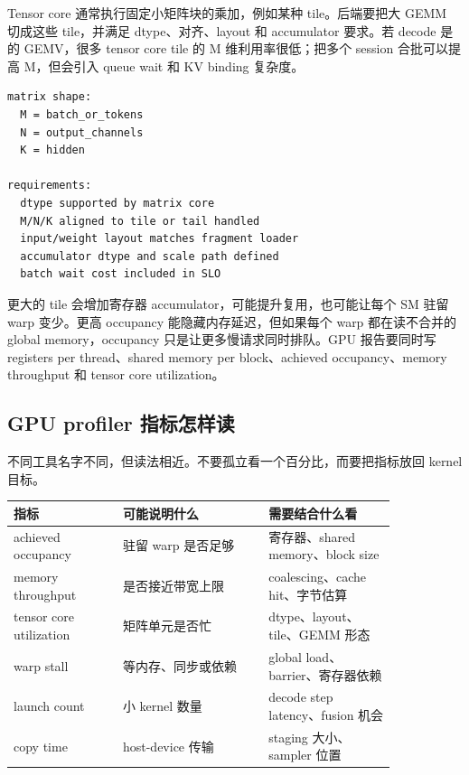 Tensor core 通常执行固定小矩阵块的乘加，例如某种  tile。后端要把大 GEMM 切成这些 tile，并满足 dtype、对齐、layout 和 accumulator 要求。若 decode 是  的 GEMV，很多 tensor core tile 的 M 维利用率很低；把多个 session 合批可以提高 M，但会引入 queue wait 和 KV binding 复杂度。

\begin{lstlisting}[numbers=none,caption={tensor core 使用前的账本}]
matrix shape:
  M = batch_or_tokens
  N = output_channels
  K = hidden

requirements:
  dtype supported by matrix core
  M/N/K aligned to tile or tail handled
  input/weight layout matches fragment loader
  accumulator dtype and scale path defined
  batch wait cost included in SLO
\end{lstlisting}

更大的 tile 会增加寄存器 accumulator，可能提升复用，也可能让每个 SM 驻留 warp 变少。更高 occupancy 能隐藏内存延迟，但如果每个 warp 都在读不合并的 global memory，occupancy 只是让更多慢请求同时排队。GPU 报告要同时写 registers per thread、shared memory per block、achieved occupancy、memory throughput 和 tensor core utilization。

\subsection{GPU profiler 指标怎样读}

不同工具名字不同，但读法相近。不要孤立看一个百分比，而要把指标放回 kernel 目标。

\begin{center}
\begin{tabular}{p{0.24\linewidth}p{0.32\linewidth}p{0.28\linewidth}}
\toprule
指标 & 可能说明什么 & 需要结合什么看 \\
\midrule
achieved occupancy & 驻留 warp 是否足够 & 寄存器、shared memory、block size \\
memory throughput & 是否接近带宽上限 & coalescing、cache hit、字节估算 \\
tensor core utilization & 矩阵单元是否忙 & dtype、layout、tile、GEMM 形态 \\
warp stall & 等内存、同步或依赖 & global load、barrier、寄存器依赖 \\
launch count & 小 kernel 数量 & decode step latency、fusion 机会 \\
copy time & host-device 传输 & staging 大小、sampler 位置 \\
\bottomrule
\end{tabular}
\end{center}

